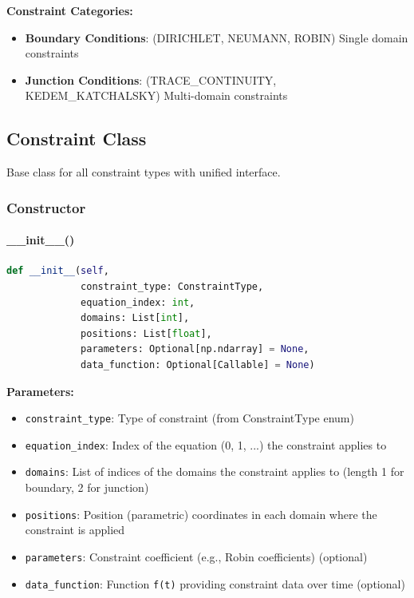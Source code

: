 \textbf{Constraint Categories:}
\begin{itemize}
    \item \textbf{Boundary Conditions}:  (DIRICHLET, NEUMANN, ROBIN) Single domain constraints
    \item \textbf{Junction Conditions}:  (TRACE\_CONTINUITY, KEDEM\_KATCHALSKY)
Multi-domain constraints \end{itemize}

\subsection{Constraint Class}
\label{subsec:constraint_class}

Base class for all constraint types with unified interface.

\subsubsection{Constructor}

\paragraph{\_\_init\_\_()}\leavevmode
\begin{lstlisting}[language=Python, caption=Constraint Constructor]
def __init__(self, 
             constraint_type: ConstraintType,
             equation_index: int,
             domains: List[int],
             positions: List[float],
             parameters: Optional[np.ndarray] = None,
             data_function: Optional[Callable] = None)
\end{lstlisting}

\textbf{Parameters:}
\begin{itemize}
    \item \texttt{constraint\_type}: Type of constraint (from ConstraintType enum)
    \item \texttt{equation\_index}: Index of the equation (0, 1, ...) the constraint applies to
    \item \texttt{domains}: List of indices of the domains the constraint applies to (length 1 for boundary, 2 for junction)
    \item \texttt{positions}: Position (parametric) coordinates in each domain where the constraint is applied
    \item \texttt{parameters}: Constraint coefficient (e.g., Robin coefficients) (optional)
    \item \texttt{data\_function}: Function \texttt{f(t)} providing constraint data over time (optional)
\end{itemize}

